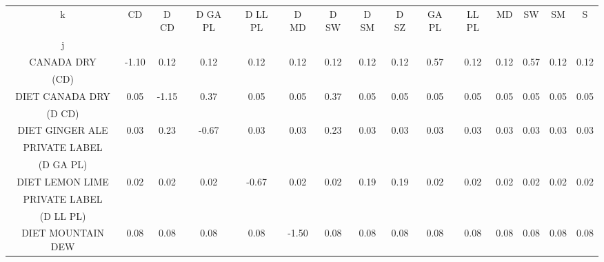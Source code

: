 \begin{tabular}{ccccccccccccccc}
\toprule
k &  CD &  D CD &  D GA PL &  D LL PL &  D MD &  D SW &  D SM &  D SZ &  GA PL &  LL PL &  MD &  SW &  SM &  S \\
j                             &             &                  &                                &                                &                    &                 &                   &                   &                           &                           &               &            &              &         \\
\midrule
CANADA DRY                    &       -1.10 &             0.12 &                           0.12 &                           0.12 &               0.12 &            0.12 &              0.12 &              0.12 &                      0.57 &                      0.12 &          0.12 &       0.57 &         0.12 &    0.12 \\
 (CD) & \\
DIET CANADA DRY               &        0.05 &            -1.15 &                           0.37 &                           0.05 &               0.05 &            0.37 &              0.05 &              0.05 &                      0.05 &                      0.05 &          0.05 &       0.05 &         0.05 &    0.05 \\
 (D CD) & \\
DIET GINGER ALE  &        0.03 &             0.23 &                          -0.67 &                           0.03 &               0.03 &            0.23 &              0.03 &              0.03 &                      0.03 &                      0.03 &          0.03 &       0.03 &         0.03 &    0.03 \\
PRIVATE LABEL & \\
 (D GA PL) & \\
DIET LEMON LIME  &        0.02 &             0.02 &                           0.02 &                          -0.67 &               0.02 &            0.02 &              0.19 &              0.19 &                      0.02 &                      0.02 &          0.02 &       0.02 &         0.02 &    0.02 \\
PRIVATE LABEL & \\
 (D LL PL) & \\
DIET MOUNTAIN DEW             &        0.08 &             0.08 &                           0.08 &                           0.08 &              -1.50 &            0.08 &              0.08 &              0.08 &                      0.08 &                      0.08 &          0.08 &       0.08 &         0.08 &    0.08 \\

\end{tabular}

